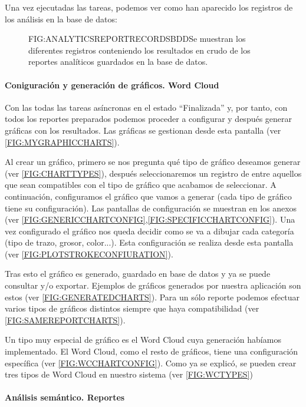  Una vez ejecutadas las tareas, podemos ver como han aparecido los registros de los análisis en la base de datos:
 
  \begin{figure}[Registros de los reportes analíticos en base de datos]{FIG:ANALYTICSREPORTRECORDSBDD}{Se muestran los diferentes registros conteniendo los resultados en crudo de los reportes analíticos guardados en la base de datos.}
	 \quad
	 \quad
	 \quad
 \end{figure}
 
\paragraph{Coniguración y generación de gráficos. Word Cloud}
Con las todas las tareas asíncronas en el estado ``Finalizada'' y, por tanto, con todos los reportes preparados podemos proceder a configurar y después generar gráficas con los resultados. Las gráficas se gestionan desde esta pantalla (ver \ref{FIG:MYGRAPHICCHARTS}). 

Al crear un gráfico, primero se nos pregunta qué tipo de gráfico deseamos generar (ver \ref{FIG:CHARTTYPES}), después seleccionaremos un registro de entre aquellos que sean compatibles con el tipo de gráfico que acabamos de seleccionar. A continuación, configuramos el gráfico que vamos a generar (cada tipo de gráfico tiene su configuración). Las pantallas de configuración se muestran en los anexos (ver \ref{FIG:GENERICCHARTCONFIG},\ref{FIG:SPECIFICCHARTCONFIG}). Una vez configurado el gráfico nos queda decidir como se va a dibujar cada categoría (tipo de trazo, grosor, color...). Esta configuración se realiza desde esta pantalla (ver \ref{FIG:PLOTSTROKECONFIURATION}).

Tras esto el gráfico es generado, guardado en base de datos y ya se puede consultar y/o exportar. Ejemplos de gráficos generados por nuestra aplicación son estos (ver \ref{FIG:GENERATEDCHARTS}). Para un sólo reporte podemos efectuar varios tipos de gráficos distintos siempre que haya compatibilidad (ver \ref{FIG:SAMEREPORTCHARTS}).

Un tipo muy especial de gráfico es el Word Cloud cuya generación habíamos implementado. El Word Cloud, como el resto de gráficos, tiene una configuración específica (ver \ref{FIG:WCCHARTCONFIG}). Como ya se explicó, se pueden crear tres tipos de Word Cloud en nuestro sistema (ver \ref{FIG:WCTYPES})

\paragraph{Análisis semántico. Reportes}